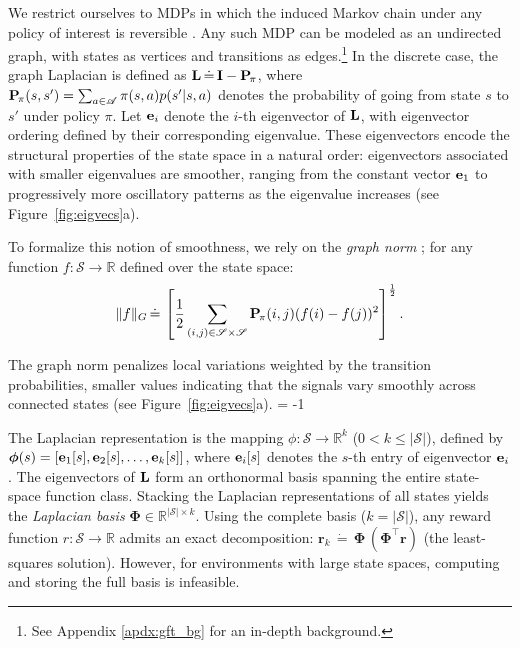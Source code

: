 \documentclass{article}
\theoremstyle{plain}
\theoremstyle{definition}
\theoremstyle{remark}
\begin{document}
We restrict ourselves to MDPs in which the induced Markov chain under any policy of interest is reversible \citep{levin2017markov}. 
Any such MDP can be modeled as an undirected graph, with states as vertices and transitions as edges.\footnote{See Appendix \ref{apdx:gft_bg} for an in-depth background.} 
In the discrete case, the graph Laplacian is defined as $\mathbf{L} \, \dot{=} \, \mathbf{I} - \mathbf{P}_{\!\pi}$, where $\mathbf{P}_{\!\pi}(s, s') = \sum_{a \in \mathscr{A}} \pi(s, a) p(s'|s, a)$ denotes the probability of going from state $s$ to $s'$ under policy $\pi$. Let $\mathbf{e}_i$ denote the $i$-th eigenvector of $\mathbf{L}$, with eigenvector ordering defined by their corresponding eigenvalue. These eigenvectors encode the structural properties of the state space in a natural order: eigenvectors associated with smaller eigenvalues are smoother, ranging from the constant vector $\mathbf{e}_1$ to progressively more oscillatory patterns as the eigenvalue increases (see Figure~\ref{fig:eigvecs}a).



To formalize this notion of smoothness, we rely on the \textit{graph norm} \citep{zhu2012approximating}; for any function $f: \mathscr{S} \to \mathbb{R}$ defined over the state space:
\begin{equation}
    \|f\|_G \, \dot{=} \, \left[ \frac{1}{2}  \sum_{(i,j) \in \mathscr{S} \times \mathscr{S}} \mathbf{P}_{\!\pi}(i, j) (f(i) - f(j))^2\right]^{\frac{1}{2}}.    
    \label{eqn:grap-norm}
\end{equation}

The graph norm penalizes local variations weighted by the transition probabilities, smaller values indicating that the signals vary smoothly across connected states (see Figure~\textcolor{neelam}{\ref{fig:eigvecs}a}). \looseness = -1


The Laplacian representation is the mapping $\phi: \mathscr{S} \rightarrow \mathbb{R}^k$ ($0 < k \le |\mathscr{S}|$), defined by $\bm{\phi}(s) = [\mathbf{e}_1[s], \mathbf{e}_2[s], \dots, \mathbf{e}_k[s]]$, where $\mathbf{e}_i[s]$ denotes the $s$-th entry of eigenvector $\mathbf{e}_i$. The eigenvectors of $\mathbf{L}$ form an orthonormal basis spanning the entire state-space function class. Stacking the Laplacian representations of all states yields the \textit{Laplacian basis} $\mathbf{\Phi} \in \mathbb{R}^{|\mathscr{S}|\times k}$. Using the complete basis ($k = |\mathscr{S}|$), any reward function ${r}: \mathscr{S} \to \mathbb{R}$ admits an exact decomposition: $\mathbf{r}_k \, \dot{=} \, \mathbf{\Phi} \, (\mathbf{\Phi}^\top \mathbf{r})$ (the least-squares solution). However, for environments with large state spaces, computing and storing the full basis is infeasible.
\end{document}
